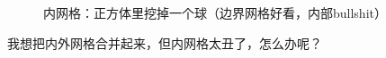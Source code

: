 \documentclass[lang=cn,11pt,a4paper]{elegantpaper}
\begin{document}
\begin{figure}[H]
\begin{minipage}[t]{0.45\textwidth}
    \end{minipage}
    \caption{内网格：正方体里挖掉一个球（边界网格好看，内部bullshit）}
\end{figure}

我想把内外网格合并起来，但内网格太丑了，怎么办呢？

\appendix
\addappheadtotoc
\end{document}
